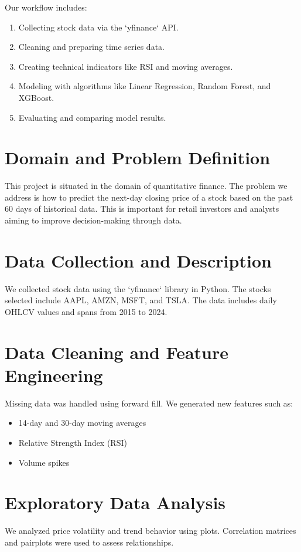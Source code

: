 \documentclass[runningheads]{llncs}
\begin{document}
Our workflow includes:
\begin{enumerate}
    \item Collecting stock data via the `yfinance` API.
    \item Cleaning and preparing time series data.
    \item Creating technical indicators like RSI and moving averages.
    \item Modeling with algorithms like Linear Regression, Random Forest, and XGBoost.
    \item Evaluating and comparing model results.
\end{enumerate}

\section{Domain and Problem Definition}
This project is situated in the domain of quantitative finance. The problem we address is how to predict the next-day closing price of a stock based on the past 60 days of historical data. This is important for retail investors and analysts aiming to improve decision-making through data.

\section{Data Collection and Description}
We collected stock data using the `yfinance` library in Python. The stocks selected include AAPL, AMZN, MSFT, and TSLA. The data includes daily OHLCV values and spans from 2015 to 2024.

\section{Data Cleaning and Feature Engineering}
Missing data was handled using forward fill. We generated new features such as:
\begin{itemize}
    \item 14-day and 30-day moving averages
    \item Relative Strength Index (RSI)
    \item Volume spikes
\end{itemize}

\section{Exploratory Data Analysis}
We analyzed price volatility and trend behavior using plots. Correlation matrices and pairplots were used to assess relationships.
\end{document}
